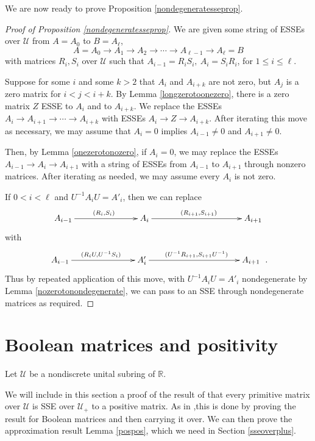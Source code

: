 \documentclass{amsart}
\theoremstyle{definition}
\theoremstyle{remark}
\numberwithin{equation}{section}
\begin{document}
{{We are now ready to prove Proposition 
\ref{nondegeneratesseprop}. 


\begin{proof}[Proof of Proposition \ref{nondegeneratesseprop}] 
We are given some string of ESSEs over $\mathcal U$ from $A=A_0$ to
$B=A_{\ell}$, 
\[
A=A_0 \to A_1 \to A_2 \to \cdots \to A_{\ell -1} \to A_{\ell}=B  
\] 
with matrices $R_i,S_i$ over $\mathcal U$ such that 
$A_{i-1}=R_iS_i, \ A_{i}= S_iR_i$, for $1\leq i \leq \ell$. 

Suppose for some $i$ and some $k>2$ that $A_i$ and $A_{i+k}$ are 
not zero, but $A_j$ is a zero matrix for $i<j<i+k$. 
By Lemma \ref{longzerotoonezero}, 
there is a zero matrix $Z$ ESSE to $A_i$ and to $A_{i+k}$. 
We replace the ESSEs 
$A_i \to A_{i+1} \to \cdots \to A_{i+k}$ 
with ESSEs $A_i\to Z \to A_{i+k}$. After iterating this 
move as necessary, we may assume that $A_i=0 $
implies $A_{i-1}\neq 0$ and $A_{i+1}\neq 0$.  

Then, by Lemma \ref{onezerotonozero}, if $A_i=0$, 
we may replace the ESSEs $A_{i-1} \to A_i\to A_{i+1}$ 
with a string of ESSEs from $A_{i-1}$ to $A_{i+1}$  through nonzero 
matrices. After iterating as needed, we may assume every $A_i$
is not zero. 

If $0< i< \ell$ and 
$U^{-1}A_iU=A'_i$, then we can replace 
\begin{equation}
\xymatrix@=
10pt{
A_{i-1} 
\ar^{(R_i,S_i)}[rrrrr] &&&&& A_i 
\ar^{(R_{i+1},S_{i+1})}[rrrrrrr]&&&&&&&  A_{i+1}  
}
\end{equation}
with 
\begin{equation}
\xymatrix@=
10pt{
A_{i-1} 
\ar^{(R_iU,U^{-1}S_i)}[rrrrr] &&&&& A'_i 
\ar^{(U^{-1}R_{i+1},S_{i+1}U^{-1})}[rrrrrrr]&&&&&&&  A_{i+1}  
}\ . 
\end{equation}
Thus by repeated application of this move, with 
$U^{-1}A_iU=A'_i$ nondegenerate by Lemma \ref{nozerotonondegenerate}, 
we can pass to an SSE through nondegenerate matrices as required. 
\end{proof} 



\section{Boolean matrices and positivity } \label{booleanappendix} 

Let $\mathcal U$ be a nondiscrete unital subring of $\mathbb R$. 

We will include in this section a proof 
of the result of \cite{KR0} that every 
primitive matrix over $\mathcal U$ is SSE over $\mathcal U_+$ to a 
positive matrix. 
As in  \cite{KR0},this is done by proving the result for Boolean 
matrices and then carrying it over. 
We can then prove the approximation result Lemma 
\ref{pospos}, which we need  in Section 
\ref{sseoverplus}.


}}
\end{document}
